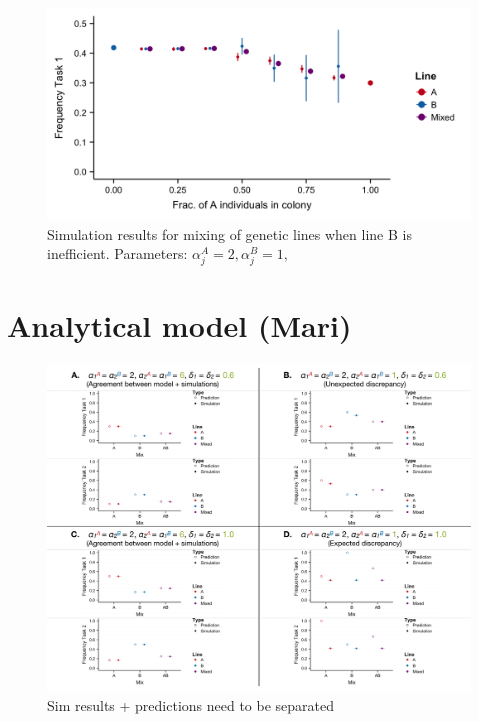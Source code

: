 \documentclass[11pt]{article}
\begin{document}
\begin{figure}[H]
    \centering
    \includegraphics[trim={0 0.25in 0 0.2in}, clip, width=0.9\linewidth]{Mix_Alphas_B-inefficient_Means.png}
    \caption{Simulation results for mixing of genetic lines when line B is inefficient. Parameters: $\alpha_j^A = 2, \alpha_j^B = 1,$}
    \label{fig:Mix_Alphas_B-inefficient}
\end{figure}

\section{Analytical model (Mari)}
\begin{figure}[H]
    \centering
    \includegraphics[trim={0 0.25in 0 0.2in}, clip, width=0.9\linewidth]{5050_comparison.pdf}
    \caption{Sim results + predictions need to be separated}
    \label{fig:5050comp}
\end{figure}
\end{document}
